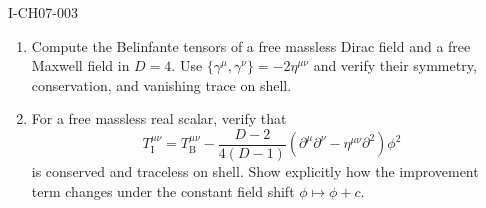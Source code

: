 \begin{exercise}{I-CH07-003}
\begin{enumerate}[label=(\alph*)]
\item Compute the Belinfante tensors of a free massless Dirac field and a
free Maxwell field in $D=4$.  Use
$\{\gamma^\mu,\gamma^\nu\}=-2\eta^{\mu\nu}$ and verify their symmetry,
conservation, and vanishing trace on shell.

\item For a free massless real scalar, verify that
\[
 T_{\mathrm I}^{\mu\nu}=T_{\mathrm B}^{\mu\nu}
 -\frac{D-2}{4(D-1)}(\partial^\mu\partial^\nu-\eta^{\mu\nu}\partial^2)\phi^2
\]
is conserved and traceless on shell.  Show explicitly how the improvement
term changes under the constant field shift $\phi\mapsto\phi+c$.
\end{enumerate}
\end{exercise}
